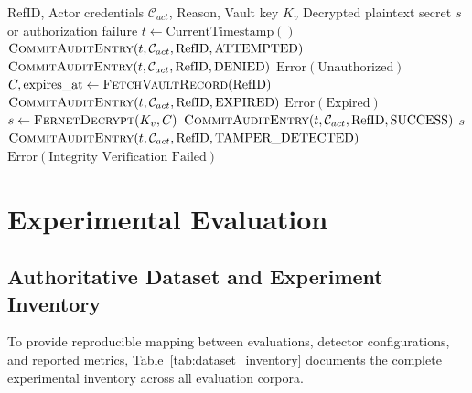 \documentclass[conference]{IEEEtran}
\begin{document}
\begin{algorithm}[t]
\caption{SecureReveal Decryption and Audit Logging}
\label{alg:reveal}
\begin{algorithmic}[1]
\REQUIRE RefID, Actor credentials $\mathcal{C}_{act}$, Reason, Vault key $K_v$
\ENSURE Decrypted plaintext secret $s$ or authorization failure
\STATE $t \leftarrow \text{CurrentTimestamp}()$
\STATE $\textsc{CommitAuditEntry}(t, \mathcal{C}_{act}, \text{RefID}, \text{ATTEMPTED})$
    \STATE $\textsc{CommitAuditEntry}(t, \mathcal{C}_{act}, \text{RefID}, \text{DENIED})$
    \RETURN $\text{Error}(\text{Unauthorized})$
\ENDIF
\STATE $C, \text{expires\_at} \leftarrow \textsc{FetchVaultRecord}(\text{RefID})$
    \STATE $\textsc{CommitAuditEntry}(t, \mathcal{C}_{act}, \text{RefID}, \text{EXPIRED})$
    \RETURN $\text{Error}(\text{Expired})$
\ENDIF
{}
    \STATE $s \leftarrow \textsc{FernetDecrypt}(K_v, C)$
    \STATE $\textsc{CommitAuditEntry}(t, \mathcal{C}_{act}, \text{RefID}, \text{SUCCESS})$
    \RETURN $s$
\ELSE
    \STATE $\textsc{CommitAuditEntry}(t, \mathcal{C}_{act}, \text{RefID}, \text{TAMPER\_DETECTED})$
    \RETURN $\text{Error}(\text{Integrity Verification Failed})$
\ENDIF
\end{algorithmic}
\end{algorithm}


\section{Experimental Evaluation}

\subsection{Authoritative Dataset and Experiment Inventory}\label{sec:dataset_inventory}
To provide reproducible mapping between evaluations, detector configurations, and reported metrics, Table~\ref{tab:dataset_inventory} documents the complete experimental inventory across all evaluation corpora.
\end{document}
